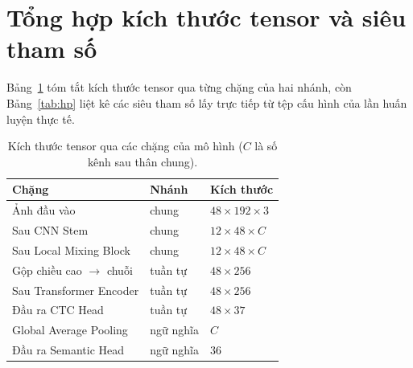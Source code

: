 \documentclass[12pt,a4paper]{report}
\begin{document}
\section{Tổng hợp kích thước tensor và siêu tham số}
Bảng~\ref{tab:shapes} tóm tắt kích thước tensor qua từng chặng của hai nhánh, còn Bảng~\ref{tab:hp} liệt kê các siêu tham số lấy trực tiếp từ tệp cấu hình của lần huấn luyện thực tế.

\begin{table}[H]
\centering
\caption{Kích thước tensor qua các chặng của mô hình ($C$ là số kênh sau thân chung).}
\label{tab:shapes}
\begin{tabular}{lll}
\toprule
\textbf{Chặng} & \textbf{Nhánh} & \textbf{Kích thước} \\
\midrule
Ảnh đầu vào & chung & $48 \times 192 \times 3$ \\
Sau CNN Stem & chung & $12 \times 48 \times C$ \\
Sau Local Mixing Block & chung & $12 \times 48 \times C$ \\
Gộp chiều cao $\rightarrow$ chuỗi & tuần tự & $48 \times 256$ \\
Sau Transformer Encoder & tuần tự & $48 \times 256$ \\
Đầu ra CTC Head & tuần tự & $48 \times 37$ \\
Global Average Pooling & ngữ nghĩa & $C$ \\
Đầu ra Semantic Head & ngữ nghĩa & $36$ \\
\bottomrule
\end{tabular}
\end{table}
\end{document}
